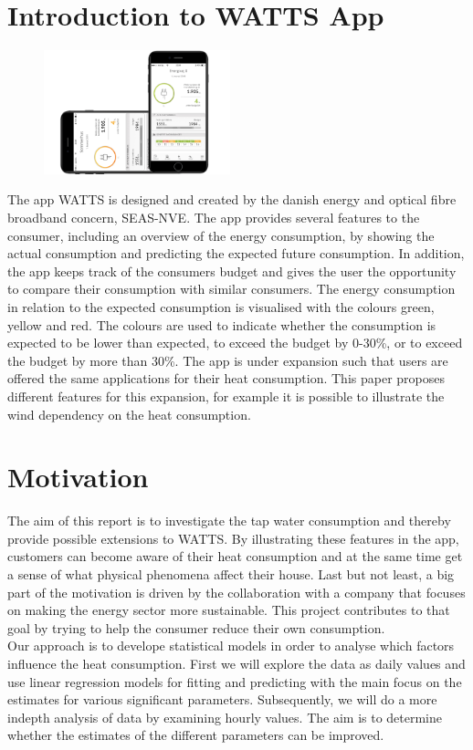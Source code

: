 \section{Introduction to WATTS App}
\begin{figure}
    \vspace{-20pt}
      \includegraphics[width=0.48\textwidth]{../../../figures/Watts.png}
    \vspace{-10pt}
  \end{figure}
The app WATTS is designed and created by the danish energy and optical fibre broadband concern, SEAS-NVE. The app provides several features to the consumer, including an overview of the energy consumption, by showing the actual consumption and predicting the expected future consumption. 
In addition, the app keeps track of the consumers budget and gives the user the opportunity to compare their consumption with similar consumers. The energy consumption in relation to the expected consumption is visualised with the colours green, yellow and red. The colours are used to indicate whether the consumption is expected to be lower than expected, to exceed the budget by 0-30\%, or to exceed the budget by more than 30\%.
\noindent The app is under expansion such that users are offered the same applications for their heat consumption. This paper proposes different features for this expansion, for example it is possible to illustrate the wind dependency on the heat consumption.

\section{Motivation}
The aim of this report is to investigate the tap water consumption and thereby provide possible extensions to WATTS. By illustrating these features in the app, customers can become aware of their heat consumption and at the same time get a sense of what physical phenomena affect their house. 
\noindent Last but not least, a big part of the motivation is driven by the collaboration with a company that focuses on making the energy sector more sustainable. This project contributes to that goal by trying to help the consumer reduce their own consumption. \\

\noindent Our approach is to develope statistical models in order to analyse which factors influence the heat consumption. First we will explore the data as daily values and use linear regression models for fitting and predicting with the main focus on the estimates for various significant parameters. Subsequently, we will do a more indepth analysis of data by examining hourly values. The aim is to determine whether the estimates of the different parameters can be improved. 
